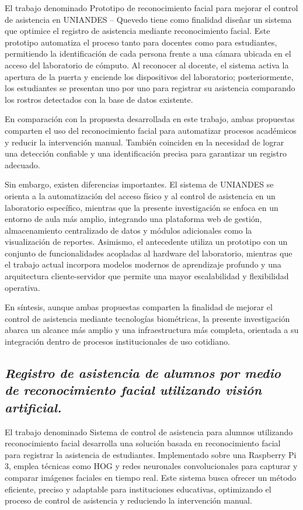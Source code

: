 El trabajo denominado Prototipo de reconocimiento facial para mejorar el control de asistencia en UNIANDES – Quevedo tiene como finalidad diseñar un sistema que optimice el registro de asistencia mediante reconocimiento facial. Este prototipo automatiza el proceso tanto para docentes como para estudiantes, permitiendo la identificación de cada persona frente a una cámara ubicada en el acceso del laboratorio de cómputo. Al reconocer al docente, el sistema activa la apertura de la puerta y enciende los dispositivos del laboratorio; posteriormente, los estudiantes se presentan uno por uno para registrar su asistencia comparando los rostros detectados con la base de datos existente\cite{prototipoUNIANDES}.

En comparación con la propuesta desarrollada en este trabajo, ambas propuestas comparten el uso del reconocimiento facial para automatizar procesos académicos y reducir la intervención manual. También coinciden en la necesidad de lograr una detección confiable y una identificación precisa para garantizar un registro adecuado.

Sin embargo, existen diferencias importantes. El sistema de UNIANDES se orienta a la automatización del acceso físico y al control de asistencia en un laboratorio específico, mientras que la presente investigación se enfoca en un entorno de aula más amplio, integrando una plataforma web de gestión, almacenamiento centralizado de datos y módulos adicionales como la visualización de reportes. Asimismo, el antecedente utiliza un prototipo con un conjunto de funcionalidades acopladas al hardware del laboratorio, mientras que el trabajo actual incorpora modelos modernos de aprendizaje profundo y una arquitectura cliente-servidor que permite una mayor escalabilidad y flexibilidad operativa.

En síntesis, aunque ambas propuestas comparten la finalidad de mejorar el control de asistencia mediante tecnologías biométricas, la presente investigación abarca un alcance más amplio y una infraestructura más completa, orientada a su integración dentro de procesos institucionales de uso cotidiano.
\subsection*{\textit{Registro de asistencia de alumnos por medio de reconocimiento facial utilizando visión artificial.}}
El trabajo denominado Sistema de control de asistencia para alumnos utilizando reconocimiento facial desarrolla una solución basada en reconocimiento facial para registrar la asistencia de estudiantes. Implementado sobre una Raspberry Pi 3, emplea técnicas como HOG y redes neuronales convolucionales para capturar y comparar imágenes faciales en tiempo real. Este sistema busca ofrecer un método eficiente, preciso y adaptable para instituciones educativas, optimizando el proceso de control de asistencia y reduciendo la intervención manual\cite{registroAsistenciaUTA}.

